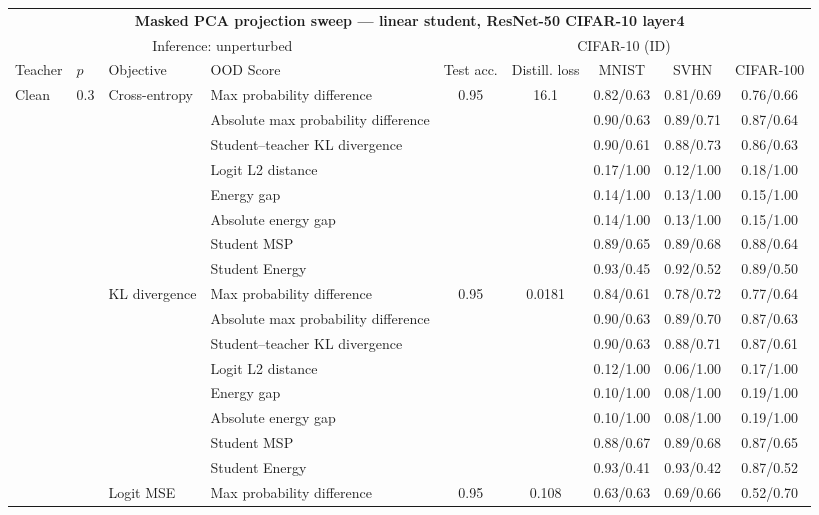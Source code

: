 \documentclass[border=2pt]{standalone}
\begin{document}
\scriptsize
\setlength{\tabcolsep}{4pt}
\begin{tabular}{llllccccc}
\multicolumn{9}{c}{\textbf{Masked PCA projection sweep --- linear student, ResNet-50 CIFAR-10 layer4}}\\[4pt]
\multicolumn{4}{c}{Inference: unperturbed} & \multicolumn{5}{c}{CIFAR-10 (ID)} \\
\cmidrule(lr){5-9}
\toprule
Teacher & $p$ & Objective & OOD Score & Test acc. & Distill. loss & MNIST & SVHN & CIFAR-100 \\
\midrule
Clean & 0.3 & Cross-entropy & Max probability difference & 0.95 & 16.1 & 0.82/0.63 & 0.81/0.69 & 0.76/0.66 \\
 &  &  & Absolute max probability difference &  &  & 0.90/0.63 & 0.89/0.71 & 0.87/0.64 \\
 &  &  & Student--teacher KL divergence &  &  & 0.90/0.61 & 0.88/0.73 & 0.86/0.63 \\
 &  &  & Logit L2 distance &  &  & 0.17/1.00 & 0.12/1.00 & 0.18/1.00 \\
 &  &  & Energy gap &  &  & 0.14/1.00 & 0.13/1.00 & 0.15/1.00 \\
 &  &  & Absolute energy gap &  &  & 0.14/1.00 & 0.13/1.00 & 0.15/1.00 \\
 &  &  & Student MSP &  &  & 0.89/0.65 & 0.89/0.68 & 0.88/0.64 \\
 &  &  & Student Energy &  &  & 0.93/0.45 & 0.92/0.52 & 0.89/0.50 \\
\addlinespace
 &  & KL divergence & Max probability difference & 0.95 & 0.0181 & 0.84/0.61 & 0.78/0.72 & 0.77/0.64 \\
 &  &  & Absolute max probability difference &  &  & 0.90/0.63 & 0.89/0.70 & 0.87/0.63 \\
 &  &  & Student--teacher KL divergence &  &  & 0.90/0.63 & 0.88/0.71 & 0.87/0.61 \\
 &  &  & Logit L2 distance &  &  & 0.12/1.00 & 0.06/1.00 & 0.17/1.00 \\
 &  &  & Energy gap &  &  & 0.10/1.00 & 0.08/1.00 & 0.19/1.00 \\
 &  &  & Absolute energy gap &  &  & 0.10/1.00 & 0.08/1.00 & 0.19/1.00 \\
 &  &  & Student MSP &  &  & 0.88/0.67 & 0.89/0.68 & 0.87/0.65 \\
 &  &  & Student Energy &  &  & 0.93/0.41 & 0.93/0.42 & 0.87/0.52 \\
\addlinespace
 &  & Logit MSE & Max probability difference & 0.95 & 0.108 & 0.63/0.63 & 0.69/0.66 & 0.52/0.70 \\

\end{tabular}
\end{document}
